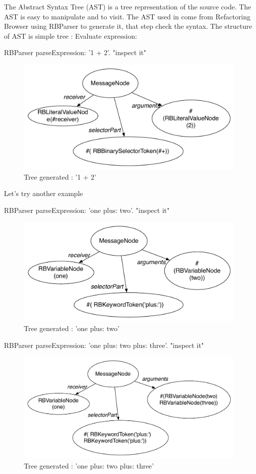 \documentclass[a4paper,10pt,twoside]{book}
\begin{document}
The Abstract Syntax Tree (AST) is a tree representation of the source code. The AST is easy to manipulate and to visit. The AST used in \opal come from Refactoring Browser using RBParser to generate it, that step check the syntax.
The structure of AST is simple tree : 
Evaluate expression:
\begin{code}{}
RBParser parseExpression: '1 + 2'.
"inspect it"
\end{code}

\begin{figure}[ht]\centering
	\includegraphics[width=0.7\linewidth]{SimpleAtomicExpression}
	\caption{Tree generated : '1 + 2'  }
\end{figure}

Let's try another example
\begin{code}{}
RBParser parseExpression: 'one plus: two'.
"inspect it"
\end{code}


\begin{figure}[ht]\centering
	\includegraphics[width=0.7\linewidth]{SimpleAtomicExpressionP}
	\caption{Tree generated : 'one plus: two' }
\end{figure}



\begin{code}{}
RBParser parseExpression: 'one plus: two plus: three'.
"inspect it"
\end{code}
\begin{figure}[ht]\centering
	\includegraphics[width=0.7\linewidth]{SimpleMultiExpression}
	\caption{Tree generated :  'one plus: two plus: three' }
\end{figure}
\end{document}
